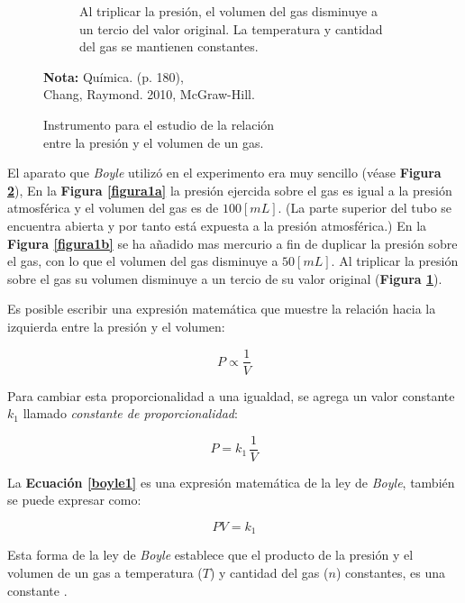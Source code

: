 \documentclass[letter,11pt]{article}
\newcommand{\source}[1]{\vspace{-11pt} \caption*{\small{\textbf{Nota:} {#1}}}}
\begin{document}
\begin{figure}
\begin{subfigure}{.30\textwidth}
    \caption{Al triplicar la presión, el volumen del gas disminuye a un tercio
    del valor original. La temperatura y cantidad del gas se mantienen
    constantes.}
    \label{figura1c}
\end{subfigure}
\caption{Instrumento para el estudio de la relación \\
entre la presión y el volumen de un gas.}
\label{figura1}
\source{Química. (p. 180), \\
Chang, Raymond. 2010, McGraw-Hill.}
\end{figure}

El aparato que \emph{Boyle} utilizó en el experimento era muy sencillo (véase
\textbf{Figura \ref{figura1}}), En la \textbf{Figura \ref{figura1a}} la presión
ejercida sobre el gas es igual a la presión atmosférica y el volumen del gas es
de $100 [mL]$. (La parte superior del tubo se encuentra abierta y por tanto está
expuesta a la presión atmosférica.) En la \textbf{Figura \ref{figura1b}} se ha
añadido mas mercurio a fin de duplicar la presión sobre el gas, con lo que el
volumen del gas disminuye a $50 [mL]$. Al triplicar la presión sobre el gas su
volumen disminuye a un tercio de su valor original
(\textbf{Figura \ref{figura1c}}).

Es posible escribir una expresión matemática que muestre la relación hacia la
izquierda entre la presión y el volumen:

\begin{equation}
    P \propto \frac{1}{V}
\label{funcional1}
\end{equation}
\vspace{0.10cm}

Para cambiar esta proporcionalidad a una igualdad, se agrega un valor constante
$k_1$ llamado \emph{constante de proporcionalidad}:

\begin{equation}
    P = k_1\,\frac{1}{V}
\label{boyle1}
\end{equation}
\vspace{0.10cm}

La \textbf{Ecuación \ref{boyle1}} es una expresión matemática de la ley de
\emph{Boyle}, también se puede expresar como:

\begin{equation}
    PV = k_1
\label{boyle2}
\end{equation}
\vspace{0.10cm}

Esta forma de la ley de \emph{Boyle} establece que el producto de la presión y
el volumen de un gas a temperatura ($T$) y cantidad del gas ($n$) constantes, es
una constante \cite{Chang}.
\end{document}
